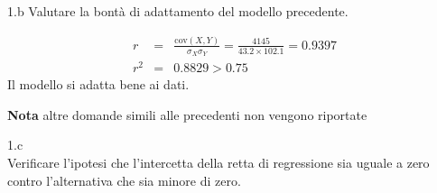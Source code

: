 \documentclass[
  11pt,
]{book}
\theoremstyle{mytheoremstyle}
\theoremstyle{mydefstyle}
\newenvironment{sol}
  {
  \begin{tcolorbox}[enhanced,breakable,arc=0.1mm,boxrule=1pt,colback=white,colframe=iblue,
  title=\bf \fontfamily{lmss}\selectfont \hspace{.5 cm} Soluzione,drop fuzzy shadow]

}{
\end{tcolorbox}
  }
\begin{document}
1.b Valutare la bontà di adattamento del modello precedente.

\begin{sol}
\begin{eqnarray*}
r&=&\frac{\text{cov}(X,Y)}{\sigma_X\sigma_Y}=\frac{ 4145 }{ 43.2 \times 102.1 }= 0.9397 \\r^2&=& 0.8829 > 0.75
\end{eqnarray*}
Il modello si adatta bene ai dati.

\end{sol}

\textbf{Nota} altre domande simili alle precedenti non vengono riportate

1.c\\
Verificare l'ipotesi che l'intercetta della retta di
regressione sia uguale a zero contro l'alternativa che sia
minore di zero.
\end{document}
